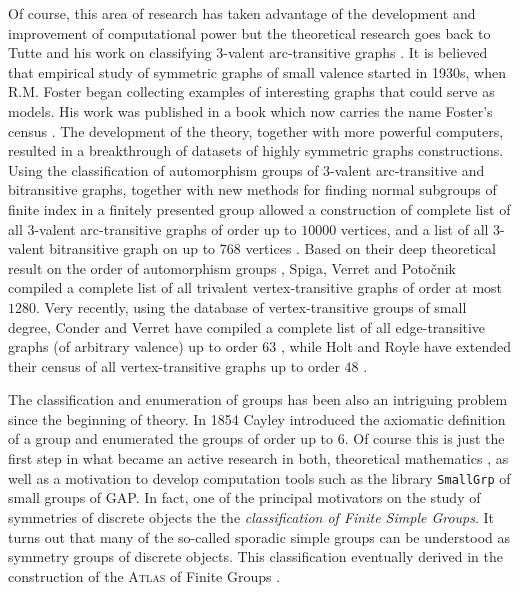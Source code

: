 Of course, this area of research has taken advantage of the development and improvement of computational power but the theoretical research goes back to Tutte and his work on classifying $3$-valent arc-transitive graphs .
It is believed that empirical study of symmetric graphs of small valence started in 1930s, when R.M. Foster  began collecting examples of interesting graphs that could serve as models.
His work was published in a book which now carries the name Foster’s census .
The development of the theory, together with more powerful computers, resulted in a breakthrough of datasets of highly symmetric graphs constructions.
Using the classification of automorphism groups of $3$-valent
arc-transitive and bitransitive graphs, together with new methods for finding normal subgroups of finite index in a finitely presented group allowed a construction of complete list of all $3$-valent arc-transitive graphs  of order up to $10 000$ vertices, and a list of all $3$-valent bitransitive graph on up to $768$ vertices .
Based on their deep theoretical result on the order of automorphism groups , Spiga, Verret and Potočnik compiled a complete list  of all trivalent vertex-transitive graphs of order at most $1280$.
Very recently, using the database of vertex-transitive groups of small degree, Conder and Verret have compiled a complete list of all edge-transitive graphs (of arbitrary valence) up to order $63$  , while
Holt and Royle have extended their census of all vertex-transitive graphs up to order $48$ .

The classification and enumeration of groups has been also an intriguing problem since the beginning of theory.
In 1854 Cayley introduced the axiomatic definition of a group and enumerated the groups of order up to $6$.
Of course this is just the first step in what became an active research in both, theoretical mathematics , as well as a motivation to develop computation tools such as the library \texttt{SmallGrp} of small groups of \textsf{GAP}.
In fact, one of the principal motivators on the study of symmetries of discrete objects the the \emph{classification of Finite Simple Groups}. It turns out that many of the so-called sporadic simple groups can be understood as symmetry groups of discrete objects. This classification eventually derived in the construction of the \textsc{Atlas} of Finite Groups  .

